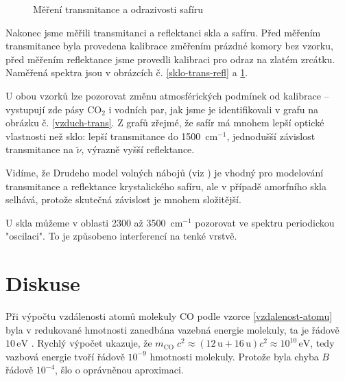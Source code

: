 \documentclass[10pt,a4paper]{article}
\renewcommand{\U}[1]{\ensuremath{\,\mathrm{#1}}}
\newcommand{\°}{\degree}
\begin{document}
\begin{figure}[p]
    \centering
    \caption{Měření transmitance a odrazivosti safíru}
    \label{safir-trans-refl}
\end{figure}

Nakonec jsme měřili transmitanci a reflektanci skla a safíru. Před měřením transmitance byla provedena kalibrace změřením prázdné komory bez vzorku, před měřením reflektance jsme provedli kalibraci pro odraz na zlatém zrcátku. Naměřená spektra jsou v obrázcích č. \ref{sklo-trans-refl} a \ref{safir-trans-refl}.

U obou vzorků lze pozorovat změnu atmosférických podmínek od kalibrace – vystupují zde pásy CO$_2$ i vodních par, jak jsme je identifikovali v grafu na obrázku č. \ref{vzduch-trans}. Z grafů zřejmé, že safír má mnohem lepší optické vlastnosti než sklo: lepší transmitance do 1500 \U{cm^{-1}}, jednodušší závislost transmitance na $\tilde\nu$, výrazně vyšší reflektance.

Vidíme, že Drudeho model volných nábojů (viz \cite{studijni-text}) je vhodný pro modelování transmitance a reflektance krystalického safíru, ale v případě amorfního skla selhává, protože skutečná závislost je mnohem složitější.

U skla můžeme v oblasti 2300 až 3500 \U{cm^{-1}} pozorovat ve spektru periodickou "oscilaci". To je způsobeno interferencí na tenké vrstvě.


\section{Diskuse}
Při výpočtu vzdálenosti atomů molekuly CO podle vzorce \eqref{vzdalenost-atomu} byla v redukované hmotnosti zanedbána vazebná energie molekuly, ta je řádově $10 \U{eV}$ \cite{wiki:carbon-monoxide}. Rychlý výpočet ukazuje, že $m_ \; c^2 \approx (12\U{u} + 16\U{u})c^2 ^{10} \U{eV}$, tedy vazbová energie tvoří řádově $10^{-9}$ hmotnosti molekuly. Protože byla chyba $B$ řádově $10^{-4}$, šlo o oprávněnou aproximaci.
\end{document}
